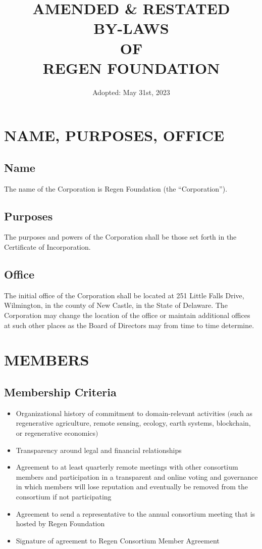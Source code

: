 \documentclass{article}
\begin{document}
\title{AMENDED \& RESTATED \protect\\ BY-LAWS \protect\\ OF \protect\\ REGEN FOUNDATION}
\author{ Adopted: May 31st, 2023}
\date{} 
\maketitle
\clearpage
\tableofcontents
\clearpage
\section{NAME, PURPOSES, OFFICE}
\subsection{Name}
The name of the Corporation is Regen Foundation (the “Corporation”).
\subsection{Purposes}
  The purposes and powers of the Corporation shall be those set forth in the Certificate of Incorporation.
\subsection{Office}
  The initial office of the Corporation shall be located at 251 Little Falls Drive, Wilmington, in the county of New Castle, in the State of Delaware.  The Corporation may change the location of the office or maintain additional offices at such other places as the Board of Directors may from time to time determine.
\section{MEMBERS}
\subsection{Membership Criteria}
\begin{itemize}
\item Organizational history of commitment to domain-relevant activities $($such as regenerative agriculture, remote sensing, ecology, earth systems, blockchain, or regenerative economics$)$
\item Transparency around legal and financial relationships
\item Agreement to at least quarterly remote meetings with other consortium members and participation in a transparent and online voting and governance in which members will lose reputation and eventually be removed from the consortium if not participating
\item Agreement to send a representative to the annual consortium meeting that is hosted by Regen Foundation
\item Signature of agreement to Regen Consortium Member Agreement
\end{itemize}
\end{document}
